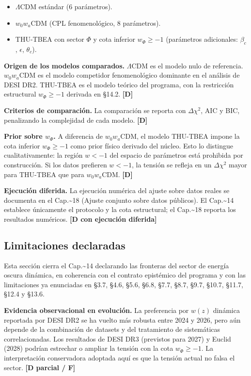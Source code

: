 ﻿\documentclass[11pt,letterpaper]{article}
\begin{document}
\begin{itemize}[leftmargin=*]
\item $\Lambda$CDM estándar (6 parámetros).
\item $w_0w_a$CDM (CPL fenomenológico, 8 parámetros).
\item THU-TBEA con sector $\Phi$ y cota inferior $w_\Phi \geq -1$ (parámetros adicionales: $\beta_c$, $\epsilon$, $\theta_c$).
\end{itemize}

\textbf{Origen de los modelos comparados.} $\Lambda$CDM es el modelo nulo de referencia. $w_0w_a$CDM es el modelo competidor fenomenológico dominante en el análisis de DESI DR2. THU-TBEA es el modelo teórico del programa, con la restricción estructural $w_\Phi \geq -1$ derivada en §14.2. \textbf{[D]}

\textbf{Criterios de comparación.} La comparación se reporta con $\Delta\chi^2$, AIC y BIC, penalizando la complejidad de cada modelo. \textbf{[D]}

\textbf{Prior sobre $w_\Phi$.} A diferencia de $w_0w_a$CDM, el modelo THU-TBEA impone la cota inferior $w_\Phi \geq -1$ como prior físico derivado del núcleo. Esto lo distingue cualitativamente: la región $w < -1$ del espacio de parámetros está prohibida por construcción. Si los datos prefieren $w < -1$, la tensión se refleja en un $\Delta\chi^2$ mayor para THU-TBEA que para $w_0w_a$CDM. \textbf{[D]}

\textbf{Ejecución diferida.} La ejecución numérica del ajuste sobre datos reales se documenta en el Cap.\textasciitilde{}18 (Ajuste conjunto sobre datos públicos). El Cap.\textasciitilde{}14 establece únicamente el protocolo y la cota estructural; el Cap.\textasciitilde{}18 reporta los resultados numéricos. \textbf{[D con ejecución diferida]}
\subsection{Limitaciones declaradas}
Esta sección cierra el Cap.\textasciitilde{}14 declarando las fronteras del sector de energía oscura dinámica, en coherencia con el contrato epistémico del programa y con las limitaciones ya enunciadas en §3.7, §4.6, §5.6, §6.8, §7.7, §8.7, §9.7, §10.7, §11.7, §12.4 y §13.6.

\textbf{Evidencia observacional en evolución.} La preferencia por $w(z)$ dinámica reportada por DESI DR2 se ha vuelto más robusta entre 2024 y 2026, pero aún depende de la combinación de datasets y del tratamiento de sistemáticas correlacionadas. Los resultados de DESI DR3 (previstos para 2027) y Euclid (2028) podrían estrechar o ampliar la tensión con la cota $w_\Phi \geq -1$. La interpretación conservadora adoptada aquí es que la tensión actual no falsa el sector. \textbf{[D parcial / F]}
\end{document}
